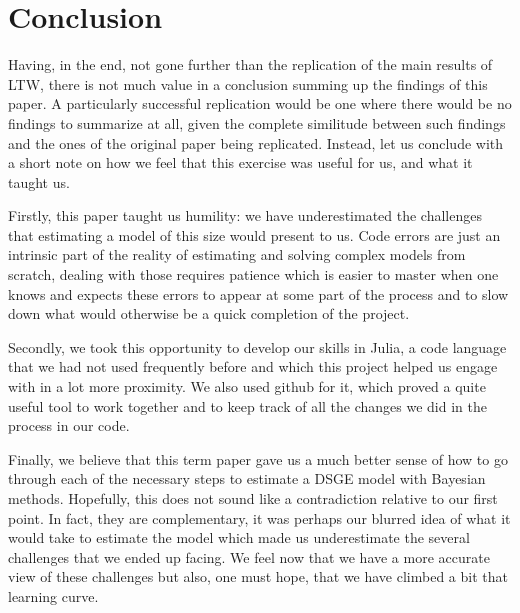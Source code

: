 \documentclass[letterpaper,12pt]{article}%
\begin{document}
\section{Conclusion}
Having, in the end, not gone further than the replication of the main results of LTW, there is not much value in a conclusion summing up the findings of this paper. A particularly successful replication would be one where there would be no findings to summarize at all, given the complete similitude between such findings and the ones of the original paper being replicated. Instead, let us conclude with a short note on how we feel that this exercise was useful for us, and what it taught us. 

Firstly, this paper taught us humility: we have underestimated the challenges that estimating a model of this size would present to us. Code errors are just an intrinsic part of the reality of estimating and solving complex models from scratch, dealing with those requires patience which is easier to master when one knows and expects these errors to appear at some part of the process and to slow down what would otherwise be a quick completion of the project.

Secondly, we took this opportunity to develop our skills in Julia, a code language that we had not used frequently before and which this project helped us engage with in a lot more proximity. We also used github for it, which proved a quite useful tool to work together and to keep track of all the changes we did in the process in our code.

Finally, we believe that this term paper gave us a much better sense of how to go through each of the necessary steps to estimate a DSGE model with Bayesian methods. Hopefully, this does not sound like a contradiction relative to our first point. In fact, they are complementary, it was perhaps our blurred idea of what it would take to estimate the model which made us underestimate the several challenges that we ended up facing. We feel now that we have a more accurate view of these challenges but also, one must hope, that we have climbed a bit that learning curve.
\end{document}
